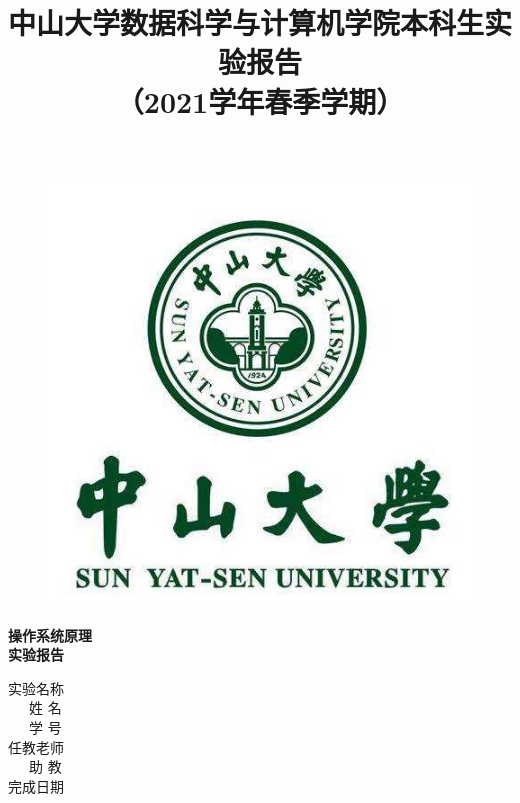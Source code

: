 \documentclass[12pt,a4paper,UTF8]{ctexart}
\title{\kaishu \LARGE 中山大学数据科学与计算机学院本科生实验报告\\
（2021学年春季学期）}
\date{}
\author{}
\begin{document}
\begin{titlepage}
    \vspace*{-3cm}
\begin{figure}[h]
    \centering
    \includegraphics[width=0.7\linewidth]{figs/sysu_logo.jpg}
\end{figure}
\begin{center}
    \Huge{\textbf{操作系统原理}}\\
    \Huge{\textbf{实验报告}}
\end{center}

\vspace*{3.5cm}
\begin{center}
        \large 
        实验名称\ \ \underline{} \\ 
        \vspace{0.3cm}
        \ \ \ 姓\; 名 \ \ \ \underline{} \\ 
        \vspace{0.3cm}
        \ \ \ 学\; 号 \ \ \ \underline{}\\
        \vspace{0.3cm}
        任教老师\ \ \underline{}\\
        \vspace{0.3cm}
        \ \ \ 助\; 教 \ \ \ \underline{}\\
        \vspace{0.3cm}
        完成日期\ \ \underline{}\\
\end{center}
\end{titlepage}
\newpage
\end{document}
